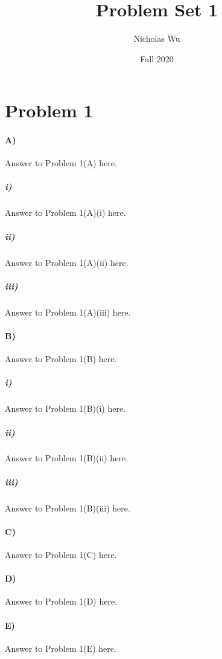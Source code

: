 \documentclass[10pt,letter]{article}
\begin{document}


\title{Problem Set 1}

\author{Nicholas Wu}

\date{Fall 2020}

\maketitle


\section*{Problem 1}

\paragraph{A)} Answer to Problem 1(A) here.

\subparagraph{i)} Answer to Problem 1(A)(i) here.

\subparagraph{ii)} Answer to Problem 1(A)(ii) here.

\subparagraph{iii)} Answer to Problem 1(A)(iii) here.

\paragraph{B)} Answer to Problem 1(B) here.

\subparagraph{i)} Answer to Problem 1(B)(i) here.

\subparagraph{ii)} Answer to Problem 1(B)(ii) here.

\subparagraph{iii)} Answer to Problem 1(B)(iii) here.

\paragraph{C)} Answer to Problem 1(C) here.

\paragraph{D)} Answer to Problem 1(D) here.

\paragraph{E)} Answer to Problem 1(E) here.
\end{document}

